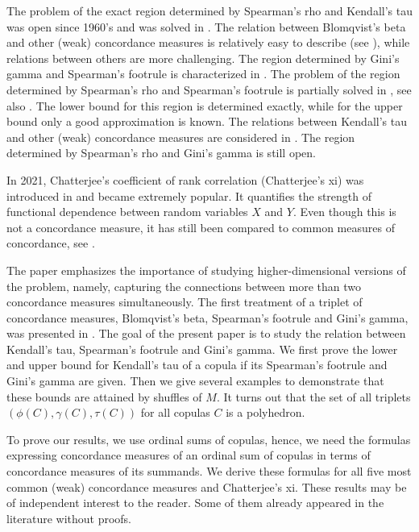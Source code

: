 \documentclass[12pt,a4paper]{amsart}
\theoremstyle{definition}
\begin{document}
The problem of the exact region determined by Spearman's rho and Kendall's tau was open since 1960's and was solved in \cite{ScPaTr}. The relation between Blomqvist's beta and other (weak) concordance measures is relatively easy to describe (see \cite{KoBuKoMoOm3}), while relations between others are more challenging. The region determined by Gini's gamma and Spearman's footrule is characterized in \cite{KoBuMo}. The problem of the region determined by Spearman's rho and Spearman's footrule is partially solved in \cite{KoBuSt2}, see also \cite{TsScTr}. The lower bound for this region is determined exactly, while for the upper bound only a good approximation is known. The relations between Kendall's tau and other (weak) concordance measures are considered in \cite{KoBuSt}. The region determined by Spearman's rho  and Gini's gamma is still open.

In 2021, Chatterjee's coefficient of rank correlation (Chatterjee's xi) was introduced in \cite{Chat} and became extremely popular. It quantifies the strength of functional dependence between random variables $X$ and $Y$. Even though this is not a concordance measure, it has still been compared to common measures of concordance, see \cite{AnRo25, FuLiSc26, Rock25}.

The paper \cite{FuLiSc26} emphasizes the importance of studying higher-dimensional versions of the problem, namely, capturing the connections between more than two concordance measures simultaneously. The first treatment of a triplet of concordance measures, Blomqvist's beta, Spearman's footrule and Gini's gamma, was presented in \cite{KoBuMo26}. The goal of the present paper is to study the relation between Kendall's tau, Spearman's footrule and Gini's gamma. We first prove the lower and upper bound for Kendall's tau of a copula if its Spearman's footrule and Gini's gamma are given. Then we give several examples to demonstrate that these bounds are attained by shuffles of $M$. It turns out that the set of all triplets $(\phi(C), \gamma(C), \tau(C))$ for all copulas $C$ is a polyhedron.

To prove our results, we use ordinal sums of copulas, hence, we need the formulas expressing concordance measures of an ordinal sum of copulas in terms of concordance measures of its summands. We derive these formulas for all five most common (weak) concordance measures and Chatterjee's xi. These results may be of independent interest to the reader. Some of them already appeared in the literature without proofs.
\end{document}
